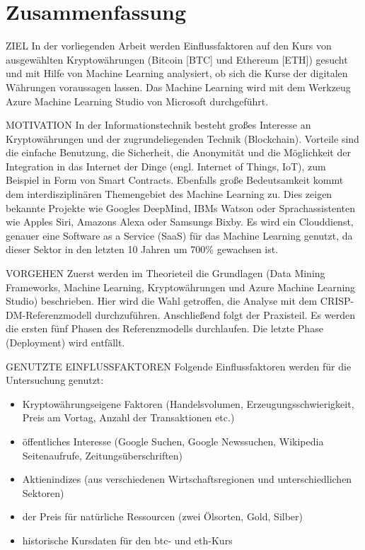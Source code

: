 \chapter*{Zusammenfassung}

{\normalsize ZIEL} \newline
In der vorliegenden Arbeit werden Einflussfaktoren auf den Kurs von ausgewählten Kryptowährungen (Bitcoin [BTC] und Ethereum [ETH]) gesucht und mit Hilfe von Machine Learning analysiert, ob sich die Kurse der digitalen Währungen voraussagen lassen. Das Machine Learning wird mit dem Werkzeug Azure Machine Learning Studio von Microsoft durchgeführt.

{\normalsize MOTIVATION} \newline
In der Informationstechnik besteht großes Interesse an Kryptowährungen und der zugrundeliegenden Technik (Blockchain). Vorteile sind die einfache Benutzung, die Sicherheit, die Anonymität und die Möglichkeit der Integration in das Internet der Dinge (engl. Internet of Things, IoT), zum Beispiel in Form von Smart Contracts. \newline
Ebenfalls große Bedeutsamkeit kommt dem interdisziplinären Themengebiet des Machine Learning zu. Dies zeigen bekannte Projekte wie Googles DeepMind, IBMs Watson oder Sprachassistenten wie Apples Siri, Amazons Alexa oder Samsungs Bixby.
\newline
Es wird ein Clouddienst, genauer eine Software as a Service (SaaS) für das Machine Learning genutzt, da dieser Sektor in den letzten 10 Jahren um 700\% gewachsen ist.

{\normalsize VORGEHEN} \newline
Zuerst werden im Theorieteil die Grundlagen (Data Mining Frameworks, Machine Learning, Kryptowährungen und Azure Machine Learning Studio) beschrieben. Hier wird die Wahl getroffen, die Analyse mit dem CRISP-DM-Referenzmodell durchzuführen.\newline
Anschließend folgt der Praxisteil. Es werden die ersten fünf Phasen des Referenzmodells durchlaufen. Die letzte Phase (Deployment) wird entfällt.

{\normalsize GENUTZTE EINFLUSSFAKTOREN} \newline
Folgende Einflussfaktoren werden für die Untersuchung genutzt:
\begin{itemize}
\item Kryptowährungseigene Faktoren (Handelsvolumen, Erzeugungsschwierigkeit, Preis am Vortag, Anzahl der Transaktionen etc.)
\item öffentliches Interesse (Google Suchen, Google Newssuchen, Wikipedia Seitenaufrufe, Zeitungsüberschriften)
\item Aktienindizes (aus verschiedenen Wirtschaftsregionen und unterschiedlichen Sektoren)
\item der Preis für natürliche Ressourcen (zwei Ölsorten, Gold, Silber)
\item historische Kursdaten für den \gls{btc}- und \gls{eth}-Kurs
\end{itemize}

